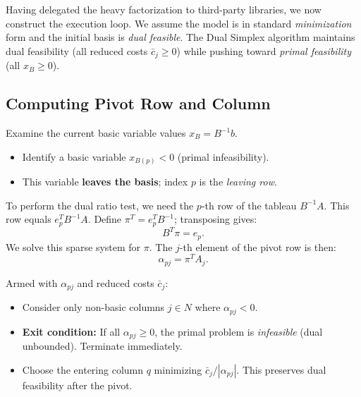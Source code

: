 \documentclass[11pt, a4paper]{article}
\begin{document}
Having delegated the heavy factorization to third-party libraries, we now construct the execution loop. We assume the model is in standard \emph{minimization} form and the initial basis is \emph{dual feasible}. The Dual Simplex algorithm maintains dual feasibility (all reduced costs $\bar{c}_j \ge 0$) while pushing toward \emph{primal feasibility} (all $x_B \ge 0$). 

\subsection{Computing Pivot Row and Column}

\begin{algostep}
Examine the current basic variable values $x_B = B^{-1}b$.
\begin{itemize}[itemsep=2pt]
    \item Identify a basic variable $x_{B(p)} < 0$ (primal infeasibility).
    \item This variable \textbf{leaves the basis}; index $p$ is the \emph{leaving row}.
\end{itemize}
\end{algostep}

\begin{algostep}
To perform the dual ratio test, we need the $p$-th row of the tableau $B^{-1}A$. This row equals $e_p^T B^{-1} A$. Define $\pi^T = e_p^T B^{-1}$; transposing gives:
\[
B^T \pi = e_p.
\]
We solve this sparse system for $\pi$. The $j$-th element of the pivot row is then:
\[
\alpha_{pj} = \pi^T A_j.
\]
\end{algostep}

\begin{algostep}
Armed with $\alpha_{pj}$ and reduced costs $\bar{c}_j$:
\begin{itemize}[itemsep=2pt]
    \item Consider only non-basic columns $j \in N$ where $\alpha_{pj} < 0$.
    \item \textbf{Exit condition:} If all $\alpha_{pj} \ge 0$, the primal problem is \emph{infeasible} (dual unbounded). Terminate immediately.
    \item Choose the entering column $q$ minimizing $\bar{c}_j / |\alpha_{pj}|$. This preserves dual feasibility after the pivot.
\end{itemize}
\end{algostep}
\end{document}
